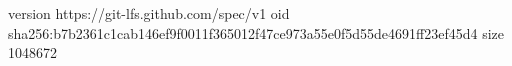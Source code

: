version https://git-lfs.github.com/spec/v1
oid sha256:b7b2361c1cab146ef9f0011f365012f47ce973a55e0f5d55de4691ff23ef45d4
size 1048672
